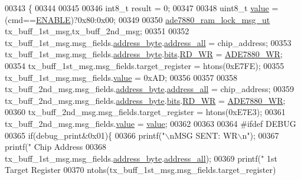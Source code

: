 \begin{DoxyCode}
00343                                                            \{
00344       
00345       
00346     int8\_t result = 0;  
00347     
00348     uint8\_t \hyperlink{a00041_a638e4503e0ae6ce655b7ad2e17e8f0ad}{value} = (cmd==\hyperlink{a00037_a514ad415fb6125ba296793df7d1a468a}{ENABLE})?0x80:0x00;
00349     
00350      \hyperlink{a00012}{ade7880\_ram\_lock\_msg\_ut} tx\_buff\_1st\_msg,tx\_buff\_2nd\_msg;
00351 
00352      tx\_buff\_1st\_msg.msg\_fields.\hyperlink{a00012_af6a65bac733ea3e9b1d24b065163d49a}{address\_byte}.\hyperlink{a00011_a7bf6defa0ae3fb2bca057a3a97d4f740}{address\_all} = chip\_address;
00353      tx\_buff\_1st\_msg.msg\_fields.\hyperlink{a00012_af6a65bac733ea3e9b1d24b065163d49a}{address\_byte}.\hyperlink{a00011_ae121725fb28cc26495969d71e0e0d42e}{bits}.\hyperlink{a00011_a97e2668c8e5470fa66185f16dc2e8045}{RD\_WR} = 
      \hyperlink{a00041_a36352e0d88dc7c5ede031013c75a678f}{ADE7880\_WR};
00354      tx\_buff\_1st\_msg.msg\_fields.target\_register = htons(0xE7FE);
00355      tx\_buff\_1st\_msg.msg\_fields.\hyperlink{a00012_a638e4503e0ae6ce655b7ad2e17e8f0ad}{value} = 0xAD;
00356      
00357      
00358      tx\_buff\_2nd\_msg.msg\_fields.\hyperlink{a00012_af6a65bac733ea3e9b1d24b065163d49a}{address\_byte}.\hyperlink{a00011_a7bf6defa0ae3fb2bca057a3a97d4f740}{address\_all} = chip\_address;
00359      tx\_buff\_2nd\_msg.msg\_fields.\hyperlink{a00012_af6a65bac733ea3e9b1d24b065163d49a}{address\_byte}.\hyperlink{a00011_ae121725fb28cc26495969d71e0e0d42e}{bits}.\hyperlink{a00011_a97e2668c8e5470fa66185f16dc2e8045}{RD\_WR} = 
      \hyperlink{a00041_a36352e0d88dc7c5ede031013c75a678f}{ADE7880\_WR};
00360      tx\_buff\_2nd\_msg.msg\_fields.target\_register = htons(0xE7E3);
00361      tx\_buff\_2nd\_msg.msg\_fields.\hyperlink{a00012_a638e4503e0ae6ce655b7ad2e17e8f0ad}{value} = \hyperlink{a00041_a638e4503e0ae6ce655b7ad2e17e8f0ad}{value};
00362      
00363 
00364 \textcolor{preprocessor}{    #ifdef DEBUG}
00365 \textcolor{preprocessor}{}       \textcolor{keywordflow}{if}(debug\_print&0x01)\{
00366        printf(\textcolor{stringliteral}{"\(\backslash\)nMSG SENT: WR\(\backslash\)n"});
00367        printf(\textcolor{stringliteral}{"       Chip Address %
00368        tx\_buff\_1st\_msg.msg\_fields.\hyperlink{a00012_af6a65bac733ea3e9b1d24b065163d49a}{address\_byte}.\hyperlink{a00011_a7bf6defa0ae3fb2bca057a3a97d4f740}{address\_all});
00369        printf(\textcolor{stringliteral}{"       1st Target Register %
00370        ntohs(tx\_buff\_1st\_msg.msg\_fields.target\_register)
}}
\end{DoxyCode}
